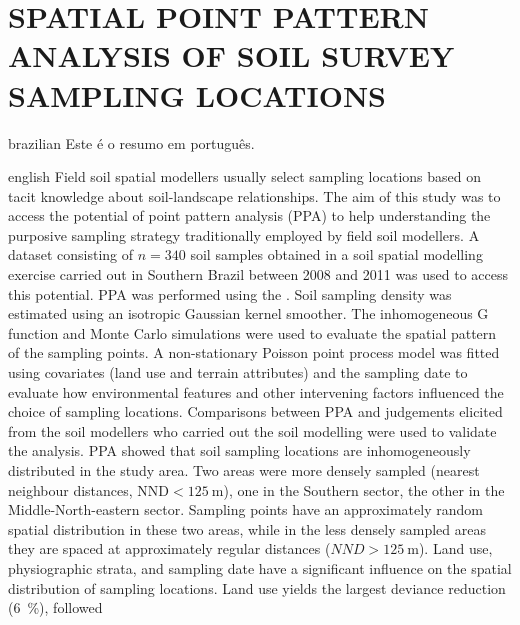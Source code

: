 \artigotrue
\chapter{SPATIAL POINT PATTERN ANALYSIS OF SOIL SURVEY SAMPLING LOCATIONS}
\label{chap:chap06}

\def\ptkeys{}

\begin{chapterabstract}{brazilian}{\portuguesekeys}
Este é o resumo em português.
\end{chapterabstract}

\def\enkeys{Digital soil mapping, Free survey, Point pattern analysis, Expert knowledge, Means-focused 
motivation}
  
\begin{chapterabstract}{english}{\englishkeys}
Field soil spatial modellers usually select sampling locations based on tacit knowledge about soil-landscape 
relationships. The aim of this study was to access the potential of point pattern analysis (PPA) to help 
understanding the purposive sampling strategy traditionally employed by field soil modellers. A dataset 
consisting of $n = 340$ soil samples obtained in a soil spatial modelling exercise carried out in Southern 
Brazil between \num{2008} and \num{2011} was used to access this potential. PPA was performed using the 
. Soil sampling density was estimated using an isotropic Gaussian kernel smoother. The 
inhomogeneous G function and Monte Carlo simulations were used to evaluate the spatial pattern of the sampling 
points. A non-stationary Poisson point process model was fitted using covariates (land use and terrain 
attributes) and the sampling date to evaluate how environmental features and other intervening factors 
influenced the choice of sampling locations. Comparisons between PPA and judgements elicited from the 
soil modellers who carried out the soil modelling were used to validate the analysis. PPA showed that soil 
sampling locations are inhomogeneously distributed in the study area. Two areas were more densely sampled 
(nearest neighbour distances, $\text{NND} < \SI{125}{\m}$), one in the Southern sector, the other in the 
Middle-North-eastern sector. Sampling points have an approximately random spatial distribution in these two 
areas, while in the less densely sampled areas they are spaced at approximately regular distances ($NND 
> \SI{125}{\m}$). Land use, physiographic strata, and sampling date have a significant influence on the spatial
distribution of sampling locations. Land use yields the largest deviance reduction (\SI{6}{\percent}), followed

\end{chapterabstract}
